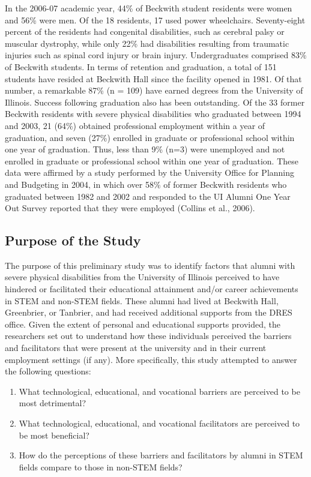 \documentclass[11.5pt]{sig-alternate} %
\begin{document}
\begin{large}
In the 2006-07 academic year, 44\% of Beckwith student residents were women and 56\% were men. Of the 18 residents, 17 used power wheelchairs. Seventy-eight percent of the residents had congenital disabilities, such as cerebral palsy or muscular dystrophy, while only 22\% had disabilities resulting from traumatic injuries such as spinal cord injury or brain injury. Undergraduates comprised 83\% of Beckwith students. In terms of retention and graduation, a total of 151 students have resided at Beckwith Hall since the facility opened in 1981. Of that number, a remarkable 87\% (n = 109) have earned degrees from the University of Illinois. Success following graduation also has been outstanding. Of the 33 former Beckwith residents with severe physical disabilities who graduated between 1994 and 2003, 21 (64\%) obtained professional employment within a year of graduation, and seven (27\%) enrolled in graduate or professional school within one year of graduation. Thus, less than 9\% (n=3) were unemployed and not enrolled in graduate or professional school within one year of graduation. These data were affirmed by a study performed by the University Office for Planning and Budgeting in 2004, in which over 58\% of former Beckwith residents who graduated between 1982 and 2002 and responded to the UI Alumni One Year Out Survey reported that they were employed (Collins et al., 2006). 

\subsection*{Purpose of the Study}
The purpose of this preliminary study was to identify factors that alumni with severe physical disabilities from the University of Illinois perceived to have hindered or facilitated their educational attainment and/or career achievements in STEM and non-STEM fields. These alumni had lived at Beckwith Hall, Greenbrier, or Tanbrier, and had received additional supports from the DRES office. Given the extent of personal and educational supports provided, the researchers set out to understand how these individuals perceived the barriers and facilitators that were present at the university and in their current employment settings (if any). More specifically, this study attempted to answer the following questions:

\begin{enumerate}
    \item What technological, educational, and vocational barriers are perceived to be most detrimental? 
    \item What technological, educational, and vocational facilitators are perceived to be most beneficial?
    \item How do the perceptions of these barriers and facilitators by alumni in STEM fields compare to those in non-STEM fields? 
\end{enumerate}


\end{large}
\end{document}
